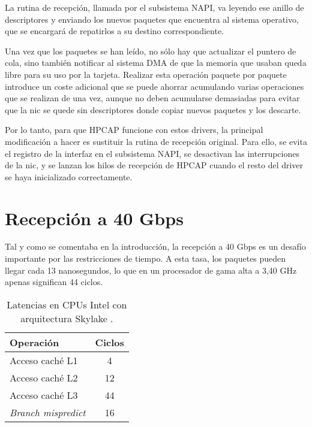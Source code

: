 \documentclass[oneside, draft]{epstfg}
\begin{document}
La rutina de recepción, llamada por el subsistema \gls{NAPI}, va leyendo ese anillo de descriptores y enviando los nuevos paquetes que encuentra al sistema operativo, que se encargará de repatirlos a su destino correspondiente.

Una vez que los paquetes se han leído, no sólo hay que actualizar el puntero de cola, sino también notificar al sistema \gls{DMA} de que la memoria que usaban queda libre para su uso por la tarjeta. Realizar esta operación paquete por paquete introduce un coste adicional que se puede ahorrar acumulando varias operaciones que se realizan de una vez, aunque no deben acumularse demasiadas para evitar que la \gls{nic} se quede sin descriptores donde copiar nuevos paquetes y los descarte.

Por lo tanto, para que HPCAP funcione con estos \glspl{driver}, la principal modificación a hacer es sustituir la rutina de recepción original. Para ello, se evita el registro de la interfaz en el subsistema \gls{NAPI}, se desactivan las interrupciones de la \gls{nic}, y se lanzan los hilos de recepción de HPCAP cuando el resto del \gls{driver} se haya inicializado correctamente.

\section{Recepción a 40 Gbps}
\label{sec:Desarrollo:Recepcion40Gbps}

Tal y como se comentaba en la introducción, la recepción a 40 Gbps es un desafío importante por las restricciones de tiempo. A esta tasa, los paquetes pueden llegar cada 13 nanosegundos, lo que en un procesador de gama alta a 3,40 GHz apenas significan 44 ciclos.

\begin{wraptable}[8]{l}[1.5cm]{0.35\textwidth}
\vspace{-15pt}
\begin{tabular}{lc}
\toprule
\textbf{Operación} & \textbf{Ciclos} \\ \midrule
Acceso caché L1 & 4 \\
Acceso caché L2 & 12 \\
Acceso caché L3 & 44 \\
\textit{Branch mispredict} & 16 \\ \bottomrule
\end{tabular}
\caption{Latencias en CPUs Intel con arquitectura Skylake \cite{intelOptimization}.}
\label{tab:LatenciaIntelSkylake}
\end{wraptable}
\end{document}
